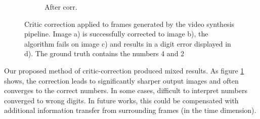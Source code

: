 \documentclass[10pt,twocolumn,letterpaper]{article}
\begin{document}
\begin{figure}[]
\begin{subfigure}[b]{0.11\textwidth}
		\caption{After corr.}
	\end{subfigure}
	\caption{Critic correction applied to frames generated by the video synthesis pipeline. Image a) is successfully corrected to image b), the algorithm fails on image c) and results in a digit error displayed in d). The ground truth contains the numbers 4 and 2}
	\label{fig:critic_correction}
\end{figure}

Our proposed method of critic-correction produced mixed results. As figure \ref{fig:critic_correction} shows, the correction leads to significantly sharper output images and often converges to the correct numbers. In some cases, difficult to interpret numbers converged to wrong digits. In future works, this could be compensated with additional information transfer from surrounding frames (in the time dimension).
\end{document}
